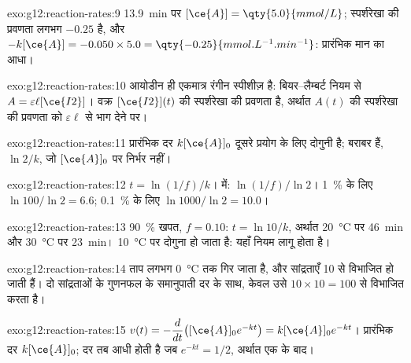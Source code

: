 \begin{solution}{exo:g12:reaction-rates:9}
\qty{13.9}{min} पर $[\ce{A}] = \qty{5.0}{mmol/L}$; स्पर्शरेखा की प्रवणता
लगभग $-0.25$ है, और $-k[\ce{A}] = -0.050 \times 5.0 =
\qty{-0.25}{mmol.L^{-1}.min^{-1}}$: प्रारंभिक मान का आधा।
\end{solution}

\begin{solution}{exo:g12:reaction-rates:10}
आयोडीन ही एकमात्र रंगीन स्पीशीज़ है: बियर--लैम्बर्ट नियम से
$A = \varepsilon \ell [\ce{I2}]$।  वक्र $[\ce{I2}](t)$ की
स्पर्शरेखा की प्रवणता है, अर्थात $A(t)$ की
स्पर्शरेखा की प्रवणता को $\varepsilon \ell$ से भाग देने पर।
\end{solution}

\begin{solution}{exo:g12:reaction-rates:11}
प्रारंभिक दर $k[\ce{A}]_0$ दूसरे प्रयोग के लिए दोगुनी है;
 बराबर हैं, $\ln 2 / k$, जो $[\ce{A}]_0$ पर निर्भर नहीं।
\end{solution}

\begin{solution}{exo:g12:reaction-rates:12}
$t = \ln(1/f)/k$।  में: $\ln(1/f)/\ln 2$। \qty{1}{\percent} के लिए
$\ln 100 / \ln 2 = 6.6$; \qty{0.1}{\percent} के लिए $\ln 1000 / \ln 2 =
10.0$।
\end{solution}

\begin{solution}{exo:g12:reaction-rates:13}
\qty{90}{\percent} खपत, $f = 0.10$: $t = \ln 10 / k$, अर्थात
\qty{20}{\celsius} पर \qty{46}{min} और \qty{30}{\celsius} पर \qty{23}{min}।
 \qty{10}{\celsius} पर दोगुना हो जाता है: यहाँ नियम लागू होता है।
\end{solution}

\begin{solution}{exo:g12:reaction-rates:14}
ताप लगभग \qty{0}{\celsius} तक गिर जाता है, और सांद्रताएँ
10 से विभाजित हो जाती हैं। दो सांद्रताओं के गुणनफल के समानुपाती दर के साथ,
केवल  उसे $10 \times 10 = 100$ से विभाजित करता है।
\end{solution}

\begin{solution}{exo:g12:reaction-rates:15}
$v(t) = -\dfrac{d}{dt}\big([\ce{A}]_0 e^{-kt}\big) = k[\ce{A}]_0 e^{-kt}$।
प्रारंभिक दर $k[\ce{A}]_0$; दर तब आधी होती है जब $e^{-kt} = 1/2$, अर्थात
एक  के बाद।
\end{solution}

